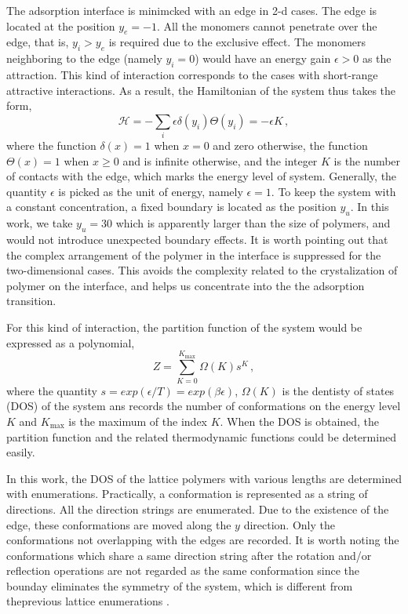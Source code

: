 \documentclass[preprint,preprintnumbers,amsmath,amssymb,showpacs,aps,pre]{revtex4-1}
\begin{document}
The adsorption interface is minimcked with an edge in 2-d cases. The edge
is located at the position $y_e=-1$. All the monomers cannot penetrate
over the edge, that is, $y_i>y_e$ is required due to the exclusive
effect. The monomers neighboring to the edge (namely $y_i=0$) would have
an energy gain $\epsilon>0$ as the attraction. This kind of interaction
corresponds to the cases with short-range attractive interactions.
As a result, the Hamiltonian
of the system thus takes the form,
\begin{equation}
{\mathcal H}=-\sum_i \epsilon \delta(y_i)\Theta(y_i) =-\epsilon K \, ,
\end{equation}
where the function $\delta(x)=1$ when $x=0$ and zero otherwise, the
function $\Theta(x)=1$ when $x\ge 0$ and is infinite otherwise, and the
integer $K$ is the number of contacts with the edge, which marks the
energy level of system. Generally, the quantity $\epsilon$ is picked 
as the unit of energy, namely $\epsilon=1$.
To keep the system with a constant concentration, a fixed boundary
is located as the position $y_u$. In this work, we take $y_u=30$
which is apparently larger than the size of polymers, and would
not introduce unexpected boundary effects. 
It is worth pointing out that the complex arrangement of the polymer
in the interface is suppressed for the two-dimensional cases. This
avoids the complexity related to the crystalization of polymer on
the interface, and helps us concentrate into the the adsorption
transition.

For this kind of interaction, the partition function of the system would be 
expressed as a polynomial,
\begin{equation}
Z=\sum_{K=0}^{K_{\text{max}}} \Omega(K) s^K \, ,
\end{equation}
where the quantity $s=exp(\epsilon/T)=exp(\beta\epsilon)$, $\Omega(K)$ is
the dentisty of states (DOS) of the system ans records the number 
of conformations on the energy level $K$ and $K_{\text{max}}$ is the
maximum of the index $K$. When the DOS is obtained, the partition function
and the related thermodynamic functions could be determined easily.

In this work, the DOS of the lattice polymers with various lengths are
determined with enumerations. Practically, a conformation is represented
as a string of directions. All the direction strings are enumerated.
Due to the existence of the edge, these conformations are moved along
the $y$ direction. Only the conformations not overlapping with the edges
are recorded. It is worth noting the conformations which share a same
direction string after the rotation and/or reflection operations are not
regarded as the same conformation since the bounday eliminates the
symmetry of the system, which is different from theprevious lattice
enumerations \cite{CieplakPRL98,PandePRL96}.
\end{document}
